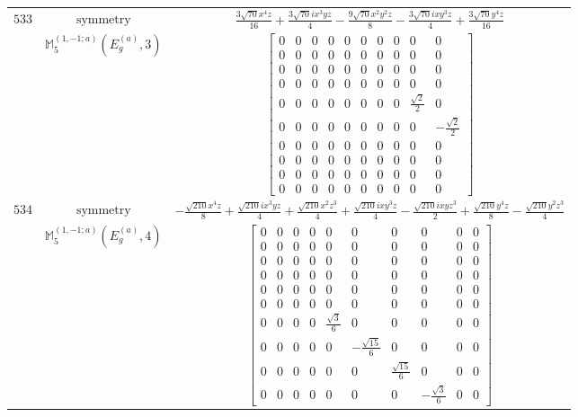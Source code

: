 \documentclass[fleqn,8pt,landscape]{jsarticle}
\begin{document}
\begin{longtable}{ccc}
$ 533 $ & $ \text{symmetry} $ & $ \frac{3 \sqrt{70} x^{4} z}{16} + \frac{3 \sqrt{70} i x^{3} y z}{4} - \frac{9 \sqrt{70} x^{2} y^{2} z}{8} - \frac{3 \sqrt{70} i x y^{3} z}{4} + \frac{3 \sqrt{70} y^{4} z}{16} $ \\
$  $ & $ \mathbb{M}_{5}^{(1,-1;a)}(E_{g}^{(a)},3) $ & $ \begin{bmatrix} 0 & 0 & 0 & 0 & 0 & 0 & 0 & 0 & 0 & 0 \\ 0 & 0 & 0 & 0 & 0 & 0 & 0 & 0 & 0 & 0 \\ 0 & 0 & 0 & 0 & 0 & 0 & 0 & 0 & 0 & 0 \\ 0 & 0 & 0 & 0 & 0 & 0 & 0 & 0 & 0 & 0 \\ 0 & 0 & 0 & 0 & 0 & 0 & 0 & 0 & \frac{\sqrt{2}}{2} & 0 \\ 0 & 0 & 0 & 0 & 0 & 0 & 0 & 0 & 0 & - \frac{\sqrt{2}}{2} \\ 0 & 0 & 0 & 0 & 0 & 0 & 0 & 0 & 0 & 0 \\ 0 & 0 & 0 & 0 & 0 & 0 & 0 & 0 & 0 & 0 \\ 0 & 0 & 0 & 0 & 0 & 0 & 0 & 0 & 0 & 0 \\ 0 & 0 & 0 & 0 & 0 & 0 & 0 & 0 & 0 & 0 \end{bmatrix} $ \\ \hline
$ 534 $ & $ \text{symmetry} $ & $ - \frac{\sqrt{210} x^{4} z}{8} + \frac{\sqrt{210} i x^{3} y z}{4} + \frac{\sqrt{210} x^{2} z^{3}}{4} + \frac{\sqrt{210} i x y^{3} z}{4} - \frac{\sqrt{210} i x y z^{3}}{2} + \frac{\sqrt{210} y^{4} z}{8} - \frac{\sqrt{210} y^{2} z^{3}}{4} $ \\
$  $ & $ \mathbb{M}_{5}^{(1,-1;a)}(E_{g}^{(a)},4) $ & $ \begin{bmatrix} 0 & 0 & 0 & 0 & 0 & 0 & 0 & 0 & 0 & 0 \\ 0 & 0 & 0 & 0 & 0 & 0 & 0 & 0 & 0 & 0 \\ 0 & 0 & 0 & 0 & 0 & 0 & 0 & 0 & 0 & 0 \\ 0 & 0 & 0 & 0 & 0 & 0 & 0 & 0 & 0 & 0 \\ 0 & 0 & 0 & 0 & 0 & 0 & 0 & 0 & 0 & 0 \\ 0 & 0 & 0 & 0 & 0 & 0 & 0 & 0 & 0 & 0 \\ 0 & 0 & 0 & 0 & \frac{\sqrt{3}}{6} & 0 & 0 & 0 & 0 & 0 \\ 0 & 0 & 0 & 0 & 0 & - \frac{\sqrt{15}}{6} & 0 & 0 & 0 & 0 \\ 0 & 0 & 0 & 0 & 0 & 0 & \frac{\sqrt{15}}{6} & 0 & 0 & 0 \\ 0 & 0 & 0 & 0 & 0 & 0 & 0 & - \frac{\sqrt{3}}{6} & 0 & 0 \end{bmatrix} $ \\ \hline

\end{longtable}
\end{document}
